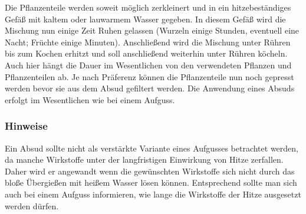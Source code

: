 Die Pflanzenteile werden soweit möglich zerkleinert und in ein hitzebeständiges Gefäß mit kaltem oder lauwarmem Wasser gegeben. In diesem Gefäß wird die Mischung nun einige Zeit Ruhen gelassen (Wurzeln einige Stunden, eventuell eine Nacht; Früchte einige Minuten). Anschließend wird die Mischung unter Rühren bis zum Kochen erhitzt und soll anschließend weiterhin unter Rühren köcheln. Auch hier hängt die Dauer im Wesentlichen von den verwendeten Pflanzen und Pflanzenteilen ab. Je nach Präferenz können die Pflanzenteile nun noch gepresst werden bevor sie aus dem Absud gefiltert werden.
Die Anwendung eines Absuds erfolgt im Wesentlichen wie bei einem Aufguss.



\subsubsection{Hinweise}
\label{   }

Ein Absud sollte nicht als verstärkte Variante eines Aufgusses betrachtet werden, da manche Wirkstoffe unter der langfristigen Einwirkung von Hitze zerfallen. Daher wird er angewandt wenn die gewünschten Wirkstoffe sich nicht durch das bloße Übergießen mit heißem Wasser lösen können. Entsprechend sollte man sich auch bei einem Aufguss informieren, wie lange die Wirkstoffe der Hitze ausgesetzt werden dürfen.

						


						
